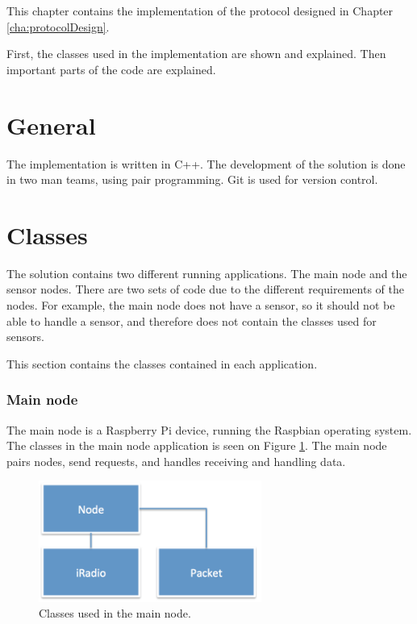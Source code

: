 This chapter contains the implementation of the protocol designed in Chapter \ref{cha:protocolDesign}. 

First, the classes used in the implementation are shown and explained. Then important parts of the code are explained.
 

\section{General}
The implementation is written in C++. The development of the solution is done in two man teams, using pair programming. Git is used for version control.

\section{Classes}
The solution contains two different running applications. The main node and the sensor nodes. There are two sets of code due to the different requirements of the nodes. For example, the main node does not have a sensor, so it should not be able to handle a sensor, and therefore does not contain the classes used for sensors.

This section contains the classes contained in each application.

\subsubsection*{Main node}
The main node is a Raspberry Pi device, running the Raspbian operating system. The classes in the main node application is seen on Figure \ref{fig:mainnodeClass}.
The main node pairs nodes, send requests, and handles receiving and handling data.

\begin{figure}[h!]
\centering
\includegraphics[width=0.65\textwidth]{chapters/implementation/figures/mainnodeClass.png}
\caption{Classes used in the main node.}
\label{fig:mainnodeClass}
\end{figure}



